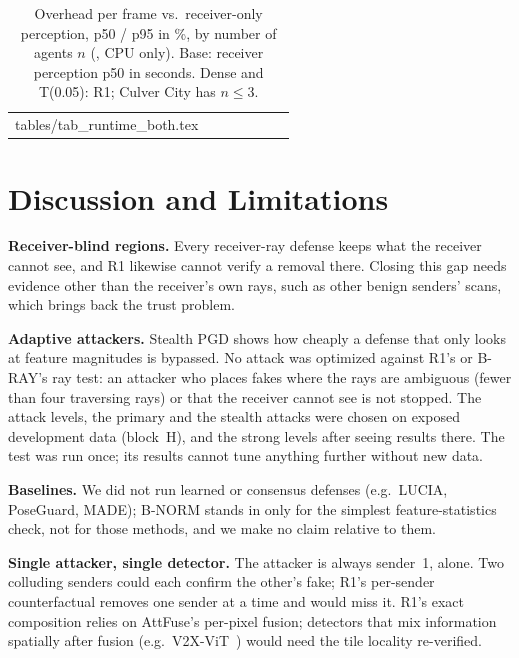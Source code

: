 \documentclass[conference]{IEEEtran}
\makeatletter
\newcommand{\tabin}[1]{\@@input #1 }
\makeatother
\begin{document}
\begin{table}[!t]
\caption{Overhead per frame vs.\ receiver-only perception, p50 / p95 in \%, by number of agents $n$ (\TimingMachine,
CPU only). Base: receiver perception p50 in seconds. Dense and T(0.05): R1; Culver City has $n\le 3$.}
\label{tab:runtime}
\centering
\footnotesize
\setlength{\tabcolsep}{4pt}
\begin{tabular}{@{}llrcccc@{}}
\toprule
\tabin{tables/tab_runtime_both.tex}
\bottomrule
\end{tabular}
\end{table}

\section{Discussion and Limitations}
\label{sec:discussion}
\textbf{Receiver-blind regions.} Every receiver-ray defense keeps what the receiver cannot see, and R1 likewise
cannot verify a removal there. Closing this gap needs evidence other than the receiver's own rays, such as other
benign senders' scans, which brings back the trust problem.

\textbf{Adaptive attackers.} Stealth PGD shows how cheaply a defense that only looks at feature magnitudes is
bypassed. No attack was optimized against R1's or B-RAY's ray test: an attacker who places fakes where the rays are
ambiguous (fewer than four traversing rays) or that the receiver cannot see is not stopped. The attack levels,
the primary and the stealth attacks were chosen on exposed development data (block~H), and the strong levels after
seeing results there. The test was run once; its results cannot tune anything further without new data.

\textbf{Baselines.} We did not run learned or consensus defenses (e.g.\ LUCIA, PoseGuard, MADE); B-NORM stands in
only for the simplest feature-statistics check, not for those methods, and we make no claim relative to them.

\textbf{Single attacker, single detector.} The attacker is always sender~1, alone. Two colluding senders could
each confirm the other's fake; R1's per-sender counterfactual removes one sender at a time and would miss it. R1's
exact composition relies on AttFuse's per-pixel fusion; detectors that mix information spatially after fusion
(e.g.\ V2X-ViT~\cite{xu2022v2xvit}) would need the tile locality re-verified.
\end{document}
